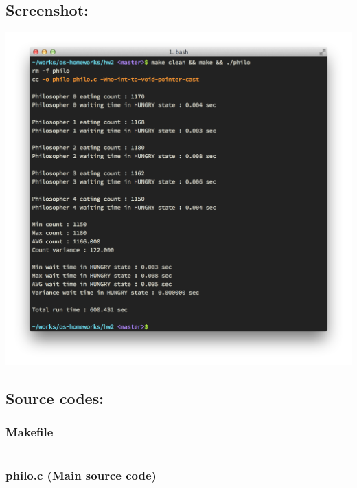 \documentclass[a4paper,11pt]{article}
\begin{document}
\subsection*{Screenshot:}
    \includegraphics[width=\textwidth]{screenshot.png}

\subsection*{Source codes:}

\subsubsection*{Makefile}
\inputminted[fontsize=\footnotesize,linenos]{basemake}{Makefile}

\subsubsection*{philo.c (Main source code)}
\inputminted[fontsize=\footnotesize,linenos]{c}{philo.c}
\end{document}
